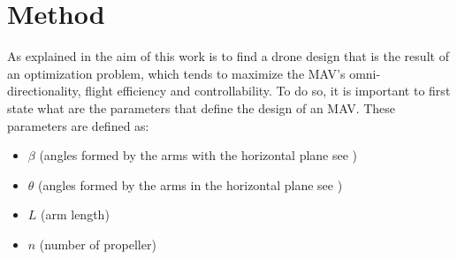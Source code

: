 \chapter{Method}
\label{sec:method}
As explained in  the aim of this work is to find a drone
design that is the result of an optimization problem, which tends to maximize the
MAV's omni-directionality, flight efficiency and controllability. To do so, it is
important to first state what are the parameters that define the design of an MAV.
These parameters are defined as:

\begin{itemize}
\item $\beta$  (angles formed by the arms with the horizontal plane see )
\item $\theta$ (angles formed by the arms in the horizontal plane see )
\item $L$ (arm length)
\item $n$ (number of propeller)
\end{itemize}

